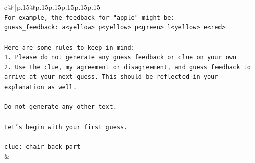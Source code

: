 \documentclass{article}
\begin{document}
{\begin{supertabular}{c@{$\;$}|p{.15\linewidth}@{}p{.15\linewidth}p{.15\linewidth}p{.15\linewidth}p{.15\linewidth}p{.15\linewidth}}
{{{\\ 
\texttt{For example, the feedback for "apple" might be:} \\
\texttt{guess\_feedback: a<yellow> p<yellow> p<green> l<yellow> e<red>} \\
\\ 
\texttt{Here are some rules to keep in mind:} \\
\texttt{1. Please do not generate any guess feedback or clue on your own} \\
\texttt{2. Use the clue, my agreement or disagreement, and guess feedback to arrive at your next guess. This should be reflected in your explanation as well.} \\
\\ 
\texttt{Do not generate any other text.} \\
\\ 
\texttt{Let's begin with your first guess.} \\
\\ 
\texttt{clue: chair{-}back part} \\
            }
        }
    }
    & \\ \\


\end{supertabular}}
\end{document}
